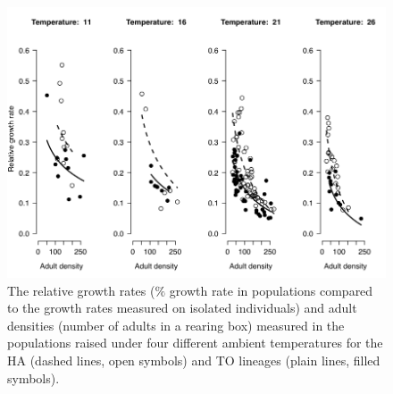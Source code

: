 \begin{figure}[!ht]
\begin{center}
\includegraphics[width=\textwidth]{1_CorpsDeThese/Resumes/Fig/FIP04}
\caption[Relative growth rates]{The relative growth rates ($\%$ growth rate in populations compared to
the growth rates measured on isolated individuals) and adult densities (number
of adults in a rearing box) measured in the populations raised under four
different ambient temperatures for the HA (dashed lines, open symbols) and TO
lineages (plain lines, filled symbols).}
\label{fig:AnFIP4}
\end{center}
\end{figure}

